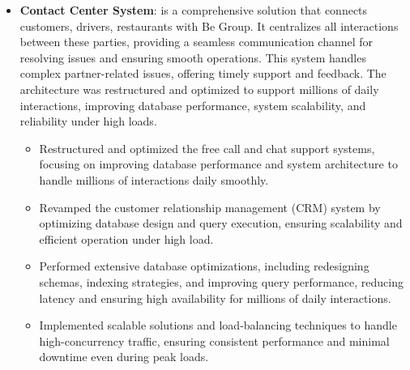 \documentclass[letterpaper,11pt]{article}
\newcommand{\resumeItem}[2]{
  \item\small{
    \textbf{#1}{: #2 \vspace{-2pt}}
  }
}
\newcommand{\resumeItemListStart}{\begin{itemize}}
\newcommand{\resumeItemListEnd}{\end{itemize}\vspace{-5pt}}
\begin{document}
    \resumeItemListStart
      \resumeItem{Contact Center System}
        {is a comprehensive solution that connects customers, drivers, restaurants with Be Group. It centralizes all interactions between these parties, providing a seamless communication channel for resolving issues and ensuring smooth operations. This system handles complex partner-related issues, offering timely support and feedback. The architecture was restructured and optimized to support millions of daily interactions, improving database performance, system scalability, and reliability under high loads.}
        \begin{itemize}
          \item Restructured and optimized the free call and chat support systems, focusing on improving database performance and system architecture to handle millions of interactions daily smoothly.
          \item Revamped the customer relationship management (CRM) system by optimizing database design and query execution, ensuring scalability and efficient operation under high load.
          \item Performed extensive database optimizations, including redesigning schemas, indexing strategies, and improving query performance, reducing latency and ensuring high availability for millions of daily interactions.
          \item Implemented scalable solutions and load-balancing techniques to handle high-concurrency traffic, ensuring consistent performance and minimal downtime even during peak loads.
        \end{itemize}
    \resumeItemListEnd
\end{document}
